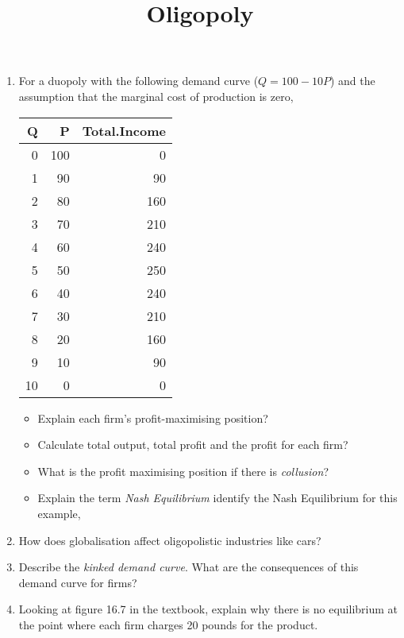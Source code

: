 \documentclass[12pt, a4paper, oneside]{article}\usepackage[]{graphicx}\usepackage[]{color}
\author{}
\date{}
\begin{document}
\title{Oligopoly}
\maketitle


\begin{enumerate}
\item For a duopoly with the following demand curve ($Q = 100 - 10P$) and the assumption that the marginal cost of production is zero, 
\begin{table}[ht]
\centering
\begin{tabular}{rrr}
  \hline
Q & P & Total.Income \\ 
  \hline
0 & 100 & 0 \\ 
  1 & 90 & 90 \\ 
  2 & 80 & 160 \\ 
  3 & 70 & 210 \\ 
  4 & 60 & 240 \\ 
  5 & 50 & 250 \\ 
  6 & 40 & 240 \\ 
  7 & 30 & 210 \\ 
  8 & 20 & 160 \\ 
  9 & 10 & 90 \\ 
  10 & 0 & 0 \\ 
   \hline
\end{tabular}
\end{table}

\begin{itemize}
\item Explain each firm's profit-maximising position? 
\item Calculate total output, total profit and the profit for each firm? 
\item What is the profit maximising position if there is \emph{collusion}?
\item Explain the term \emph{Nash Equilibrium} identify the Nash Equilibrium for this example,
\end{itemize}

\item How does globalisation affect oligopolistic industries like cars? 

\item Describe the \emph{kinked demand curve}.  What are the consequences of this demand curve for firms? 

\item Looking at figure 16.7 in the textbook, explain why there is no equilibrium at the point where each firm charges 20 pounds for the product.  


\end{enumerate}
\end{document}
